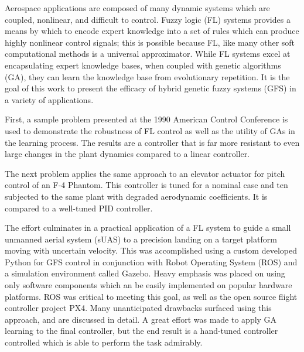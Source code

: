 Aerospace applications are composed of many dynamic systems which are coupled, nonlinear, and difficult to
control. Fuzzy logic (FL) systems  provides a means by which to encode expert knowledge into a set of rules
which can produce highly nonlinear control signals; this is possible because FL, like many other soft
computational methods is a universal approximator. While FL systems excel at encapsulating expert knowledge
bases, when coupled with genetic algorithms (GA), they can learn the knowledge base from evolutionary
repetition. It is the goal of this work to present the efficacy of hybrid genetic fuzzy systems (GFS) in a
variety of applications.

First, a sample problem presented at the 1990 American Control Conference is used to demonstrate the
robustness of FL control as well as the utility of GAs in the learning process. The results are a controller
that is far more resistant to even large changes in the plant dynamics compared to a linear controller.

The next problem applies the same approach to an elevator actuator for pitch control of an F-4 Phantom. This
controller is tuned for a nominal case and ten subjected to the same plant with degraded aerodynamic
coefficients. It is compared to a well-tuned PID controller.

The effort culminates in a practical application of a FL system to guide a small unmanned aerial system (sUAS)
to a precision landing on a target platform moving with uncertain velocity. This was accomplished using a
custom developed Python for GFS control in conjunction with Robot Operating System (ROS) and a simulation
environment called Gazebo. Heavy emphasis was placed on using only software components which an be easily
implemented on popular hardware platforms. ROS was critical to meeting this goal, as well as the open source
flight controller project PX4. Many unanticipated drawbacks surfaced using this approach, and are discussed in
detail. A great effort was made to apply GA learning to the final controller, but the end result is a
hand-tuned controller controlled which is able to perform the task admirably.

